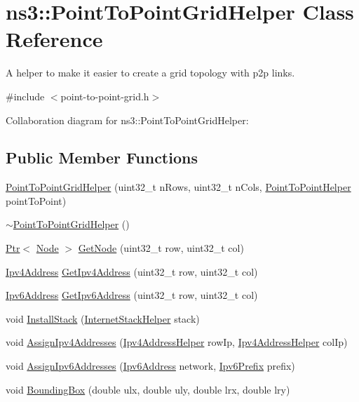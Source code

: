 \hypertarget{classns3_1_1PointToPointGridHelper}{}\section{ns3\+:\+:Point\+To\+Point\+Grid\+Helper Class Reference}
\label{classns3_1_1PointToPointGridHelper}


A helper to make it easier to create a grid topology with p2p links.  




{\ttfamily \#include $<$point-\/to-\/point-\/grid.\+h$>$}



Collaboration diagram for ns3\+:\+:Point\+To\+Point\+Grid\+Helper\+:
\subsection*{Public Member Functions}
\begin{DoxyCompactItemize}
\item 
\hyperlink{classns3_1_1PointToPointGridHelper_aec079675004436bb898b707679a770a0}{Point\+To\+Point\+Grid\+Helper} (uint32\+\_\+t n\+Rows, uint32\+\_\+t n\+Cols, \hyperlink{classns3_1_1PointToPointHelper}{Point\+To\+Point\+Helper} point\+To\+Point)
\item 
\hyperlink{classns3_1_1PointToPointGridHelper_a5ea18f25eb92b3b9bbb374d350e2968e}{$\sim$\+Point\+To\+Point\+Grid\+Helper} ()
\item 
\hyperlink{classns3_1_1Ptr}{Ptr}$<$ \hyperlink{classns3_1_1Node}{Node} $>$ \hyperlink{classns3_1_1PointToPointGridHelper_a3164f103d3d462f9a143da7047007651}{Get\+Node} (uint32\+\_\+t row, uint32\+\_\+t col)
\item 
\hyperlink{classns3_1_1Ipv4Address}{Ipv4\+Address} \hyperlink{classns3_1_1PointToPointGridHelper_a2ba35716431dbe792a8e11ab18e93a0c}{Get\+Ipv4\+Address} (uint32\+\_\+t row, uint32\+\_\+t col)
\item 
\hyperlink{classns3_1_1Ipv6Address}{Ipv6\+Address} \hyperlink{classns3_1_1PointToPointGridHelper_a64a6d4842343ad4ad9040c81f29fafe4}{Get\+Ipv6\+Address} (uint32\+\_\+t row, uint32\+\_\+t col)
\item 
void \hyperlink{classns3_1_1PointToPointGridHelper_a11791aff26cdc185fbaee2309c919771}{Install\+Stack} (\hyperlink{classns3_1_1InternetStackHelper}{Internet\+Stack\+Helper} stack)
\item 
void \hyperlink{classns3_1_1PointToPointGridHelper_a96ae3a60a6d9fa3b1501d32193cd6fb7}{Assign\+Ipv4\+Addresses} (\hyperlink{classns3_1_1Ipv4AddressHelper}{Ipv4\+Address\+Helper} row\+Ip, \hyperlink{classns3_1_1Ipv4AddressHelper}{Ipv4\+Address\+Helper} col\+Ip)
\item 
void \hyperlink{classns3_1_1PointToPointGridHelper_a14989a2160bb0fe95af28cc59f1fd4ef}{Assign\+Ipv6\+Addresses} (\hyperlink{classns3_1_1Ipv6Address}{Ipv6\+Address} network, \hyperlink{classns3_1_1Ipv6Prefix}{Ipv6\+Prefix} prefix)
\item 
void \hyperlink{classns3_1_1PointToPointGridHelper_a82af43032d0e92c3dc5b259d0f800961}{Bounding\+Box} (double ulx, double uly, double lrx, double lry)
\end{DoxyCompactItemize}
